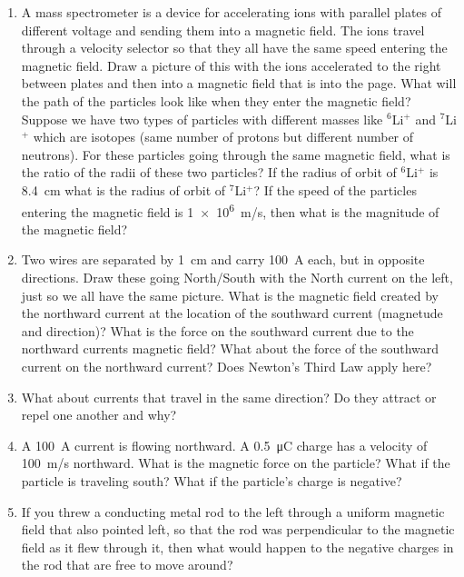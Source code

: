 \begin{enumerate}
\item
A mass spectrometer is a device for accelerating ions with parallel plates of different voltage and sending them into a magnetic field. The ions travel through a velocity selector so that they all have the same speed entering the magnetic field. Draw a picture of this with the ions accelerated to the right between plates and then into a magnetic field that is into the page. What will the path of the particles look like when they enter the magnetic field? Suppose we have two types of particles with different masses like $^6$Li$^+$ and $^7$Li$^+$ which are isotopes (same number of protons but different number of neutrons). For these particles going through the same magnetic field, what is the ratio of the radii of these two particles? If the radius of orbit of $^6$Li$^+$ is \SI{8.4}{cm} what is the radius of orbit of $^7$Li$^+$? If the speed of the particles entering the magnetic field is \SI{1e6}{m/s}, then what is the magnitude of the magnetic field?

\item
Two wires are separated by \SI{1}{cm} and carry \SI{100}{\ampere} each, but in opposite directions. Draw these going North/South with the North current on the left, just so we all have the same picture. What is the magnetic field created by the northward current at the location of the southward current (magnetude and direction)? What is the force on the southward current due to the northward currents magnetic field? What about the force of the southward current on the northward current? Does Newton's Third Law apply here?

\item
What about currents that travel in the same direction? Do they attract or repel one another and why?

\item
A \SI{100}{\ampere} current is flowing northward. A \SI{0.5}{\micro\coulomb} charge has a velocity of \SI{100}{m/s} northward. What is the magnetic force on the particle? What if the particle is traveling south? What if the particle's charge is negative? 




\item
If you threw a conducting metal rod to the left through a uniform magnetic field that also pointed left, so that the rod was perpendicular to the magnetic field as it flew through it, then what would happen to the negative charges in the rod that are free to move around? 


\end{enumerate}
